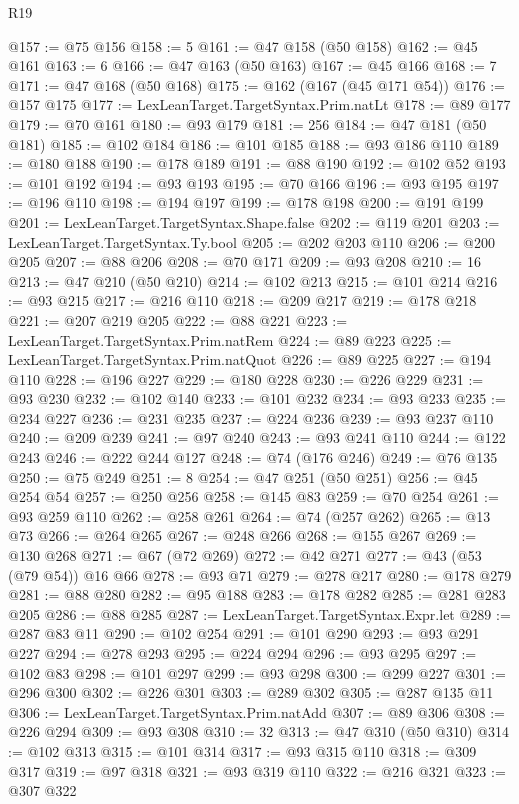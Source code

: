 \begin{lexlean}{R19}
\begin{coremodule}
@157 := @75 @156
@158 := 5
@161 := @47 @158 (@50 @158)
@162 := @45 @161
@163 := 6
@166 := @47 @163 (@50 @163)
@167 := @45 @166
@168 := 7
@171 := @47 @168 (@50 @168)
@175 := @162 (@167 (@45 @171 @54))
@176 := @157 @175
@177 := LexLeanTarget.TargetSyntax.Prim.natLt
@178 := @89 @177
@179 := @70 @161
@180 := @93 @179
@181 := 256
@184 := @47 @181 (@50 @181)
@185 := @102 @184
@186 := @101 @185
@188 := @93 @186 @110
@189 := @180 @188
@190 := @178 @189
@191 := @88 @190
@192 := @102 @52
@193 := @101 @192
@194 := @93 @193
@195 := @70 @166
@196 := @93 @195
@197 := @196 @110
@198 := @194 @197
@199 := @178 @198
@200 := @191 @199
@201 := LexLeanTarget.TargetSyntax.Shape.false
@202 := @119 @201
@203 := LexLeanTarget.TargetSyntax.Ty.bool
@205 := @202 @203 @110
@206 := @200 @205
@207 := @88 @206
@208 := @70 @171
@209 := @93 @208
@210 := 16
@213 := @47 @210 (@50 @210)
@214 := @102 @213
@215 := @101 @214
@216 := @93 @215
@217 := @216 @110
@218 := @209 @217
@219 := @178 @218
@221 := @207 @219 @205
@222 := @88 @221
@223 := LexLeanTarget.TargetSyntax.Prim.natRem
@224 := @89 @223
@225 := LexLeanTarget.TargetSyntax.Prim.natQuot
@226 := @89 @225
@227 := @194 @110
@228 := @196 @227
@229 := @180 @228
@230 := @226 @229
@231 := @93 @230
@232 := @102 @140
@233 := @101 @232
@234 := @93 @233
@235 := @234 @227
@236 := @231 @235
@237 := @224 @236
@239 := @93 @237 @110
@240 := @209 @239
@241 := @97 @240
@243 := @93 @241 @110
@244 := @122 @243
@246 := @222 @244 @127
@248 := @74 (@176 @246)
@249 := @76 @135
@250 := @75 @249
@251 := 8
@254 := @47 @251 (@50 @251)
@256 := @45 @254 @54
@257 := @250 @256
@258 := @145 @83
@259 := @70 @254
@261 := @93 @259 @110
@262 := @258 @261
@264 := @74 (@257 @262)
@265 := @13 @73
@266 := @264 @265
@267 := @248 @266
@268 := @155 @267
@269 := @130 @268
@271 := @67 (@72 @269)
@272 := @42 @271
@277 := @43 (@53 (@79 @54)) @16 @66
@278 := @93 @71
@279 := @278 @217
@280 := @178 @279
@281 := @88 @280
@282 := @95 @188
@283 := @178 @282
@285 := @281 @283 @205
@286 := @88 @285
@287 := LexLeanTarget.TargetSyntax.Expr.let
@289 := @287 @83 @11
@290 := @102 @254
@291 := @101 @290
@293 := @93 @291 @227
@294 := @278 @293
@295 := @224 @294
@296 := @93 @295
@297 := @102 @83
@298 := @101 @297
@299 := @93 @298
@300 := @299 @227
@301 := @296 @300
@302 := @226 @301
@303 := @289 @302
@305 := @287 @135 @11
@306 := LexLeanTarget.TargetSyntax.Prim.natAdd
@307 := @89 @306
@308 := @226 @294
@309 := @93 @308
@310 := 32
@313 := @47 @310 (@50 @310)
@314 := @102 @313
@315 := @101 @314
@317 := @93 @315 @110
@318 := @309 @317
@319 := @97 @318
@321 := @93 @319 @110
@322 := @216 @321
@323 := @307 @322

\end{coremodule}
\end{lexlean}
